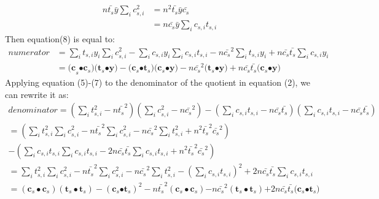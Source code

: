 \begin{appendices}
\begin{equation}\label{ap:eq9}
\begin{aligned}
n\bar{t_{s}}\bar{y}\sum\nolimits_i c_{s,i}^{2} &=n^{2}\bar{t_{s}}\bar{y}\bar{c_{s}}\\
&=n\bar{c_{s}}\bar{y}\sum\nolimits_i {c_{s,i}t_{s,i}}
\end{aligned}
\end{equation}
Then equation(8) is equal to:
\begin{equation}\label{ap:eq10}
\begin{aligned}
numerator&=\sum\nolimits_i {t_{s,i}y_{i}} \sum\nolimits_i c_{s,i}^{2} -\sum\nolimits_i {c_{s,i}y_{i}} \sum\nolimits_i {c_{s,i}t_{s,i}} -n\bar{c_{s}}^{2}\sum\nolimits_i {t_{s,i}y_{i}} +n\bar{c_{s}}\bar{t_{s}}\sum\nolimits_i {c_{s,i}y_{i}}\\
 & ={(\mathbf{c}}_{s}\mathbf{\bullet }\mathbf{c}_{s}\mathbf{)(}\mathbf{t}_{s}\mathbf{\bullet y)}-(\mathbf{c}_{s}\mathbf{\bullet }\mathbf{t}_{s}\mathbf{)(}\mathbf{c}_{s}\mathbf{\bullet y)}-n\bar{c_{s}}^{2}\mathbf{(}\mathbf{t}_{s}\mathbf{\bullet y)+}n\bar{c_{s}}\bar{t_{s}}(\mathbf{c}_{s}\mathbf{\bullet y)}
 \end{aligned}
\end{equation}
Applying equation (5)-(7) to the denominator of the quotient in equation (2), we can rewrite it as:
\begin{equation}\label{ap:eq11}
\begin{array}{l}
denominator=\left( \sum\nolimits_i t_{s,i}^{2} -n\bar{t_{s}}^{2} \right)\left( \sum\nolimits_i c_{s,i}^{2} -n\bar{c_{s}}^{2} \right)-\left( \sum\nolimits_i {c_{s,i}t_{s,i}} -n\bar{c_{s}}\bar{t_{s}} \right)\left( \sum\nolimits_i {c_{s,i}t_{s,i}} -n\bar{c_{s}}\bar{t_{s}} \right)\\
=\left( \sum\nolimits_i t_{s,i}^{2} \sum\nolimits_i c_{s,i}^{2} -n\bar{t_{s}}^{2}\sum\nolimits_i c_{s,i}^{2} -n\bar{c_{s}}^{2}\sum\nolimits_i t_{s,i}^{2} +n^{2}\bar{t_{s}}^{2}\bar{c_{s}}^{2} \right)\\
-\left( \sum\nolimits_i {c_{s,i}t_{s,i}} \sum\nolimits_i {c_{s,i}t_{s,i}} -2n\bar{c_{s}}\bar{t_{s}}\sum\nolimits_i {c_{s,i}t_{s,i}} +n^{2}\bar{t_{s}}^{2}\bar{c_{s}}^{2} \right)\\
=\sum\nolimits_i t_{s,i}^{2} \sum\nolimits_i c_{s,i}^{2} -n\bar{t_{s}}^{2}\sum\nolimits_i c_{s,i}^{2} -n\bar{c_{s}}^{2}\sum\nolimits_i t_{s,i}^{2} -\left( \sum\nolimits_i {c_{s,i}t_{s,i}} \right)^{2}+2n\bar{c_{s}}\bar{t_{s}}\sum\nolimits_i {c_{s,i}t_{s,i}} \\
=\left( \mathbf{c}_{s}\bullet \mathbf{c}_{s} \right)\left( \mathbf{t}_{s}\bullet \mathbf{t}_{s} \right)-\left( \mathbf{c}_{s}\mathbf{\bullet }\mathbf{t}_{s} \right)^{2}-n\bar{t_{s}}^{2}\left( \mathbf{c}_{s}\bullet \mathbf{c}_{s} \right)\mathbf{-}n\bar{c_{s}}^{2}\left( \mathbf{t}_{s}\bullet \mathbf{t}_{s} \right)\mathbf{+}2n\bar{c_{s}}\bar{t_{s}}\mathbf{(}\mathbf{c}_{s}\mathbf{\bullet }\mathbf{t}_{s}\mathbf{)}
\end{array}
\end{equation}

\end{appendices}